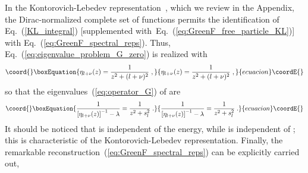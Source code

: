 \documentclass[a4paper,preprint,draft,showpacs,amsmath,amsfonts,amssymb,aps,prd]{revtex4}%
\begin{document}
In the Kontorovich-Lebedev representation~\cite{kontorovich},
which we review in the Appendix,
the Dirac-normalized complete set of functions
\coordHE{}
permits the identification of 
Eq.~(\ref{KL_integral})  
[supplemented with~Eq.~(\ref{eq:GreenF_free_particle_KL})]
with Eq.~(\ref{eq:GreenF_spectral_reps}). 
Thus,
Eq.~(\ref{eq:eigenvalue_problem_G_zero}) 
is realized with
\begin{equation}\coord{}\boxEquation{
 \eta_{l+\nu}(z)
 = 
\frac{1}{z^{2} + (l+\nu)^{2} }
\;  ,
\label{eq:GreenF_order_zero_eigenvalues}
}{
 \eta_{l+\nu}(z)
 = 
\frac{1}{z^{2} + (l+\nu)^{2} }
\;  ,
}{ecuacion}\coordE{}\end{equation}
so that the eigenvalues~(\ref{eq:operator_G}) of 
\coordHE{}
are 
\begin{equation}\coord{}\boxEquation{
\frac{1}{
\left[ \eta_{l+\nu}(z) \right]^{-1}
- \lambda }
= 
\frac{1}{
z^{2} + s_{l}^{2}
}
\;  .
\label{eq:GreenF_eigenvalues}
}{
\frac{1}{
\left[ \eta_{l+\nu}(z) \right]^{-1}
- \lambda }
= 
\frac{1}{
z^{2} + s_{l}^{2}
}
\;  .
}{ecuacion}\coordE{}\end{equation}
It should be noticed that
\coordHE{} is independent of the energy, while
\coordHE{} is independent of \coordHE{};
this is characteristic of the  Kontorovich-Lebedev representation.
Finally,
the remarkable reconstruction~(\ref{eq:GreenF_spectral_reps}) can be explicitly carried out,
\end{document}
